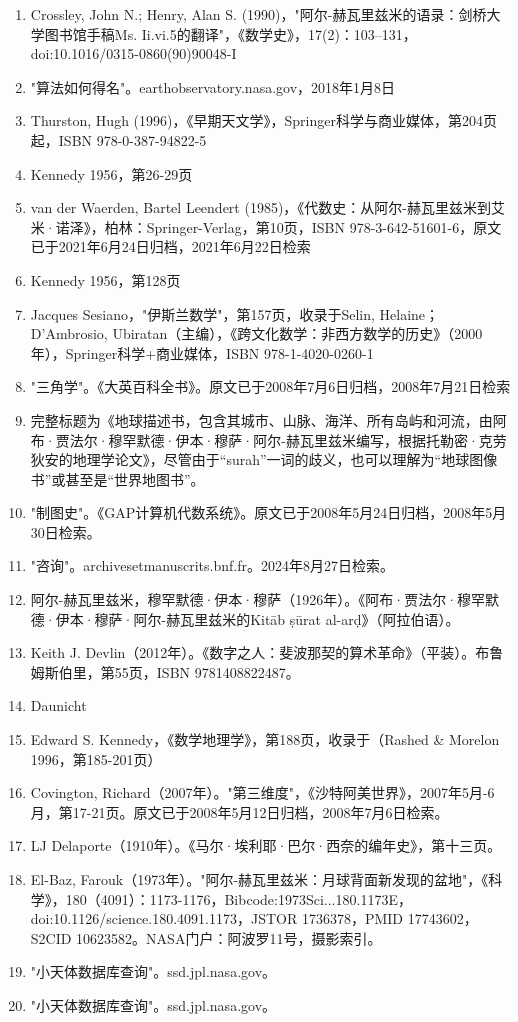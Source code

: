 \begin{enumerate}
\item Crossley, John N.; Henry, Alan S. (1990)，"阿尔-赫瓦里兹米的语录：剑桥大学图书馆手稿Ms. Ii.vi.5的翻译"，《数学史》，17(2)：103–131，doi:10.1016/0315-0860(90)90048-I  
\item "算法如何得名"。earthobservatory.nasa.gov，2018年1月8日  
\item Thurston, Hugh (1996)，《早期天文学》，Springer科学与商业媒体，第204页起，ISBN 978-0-387-94822-5  
\item Kennedy 1956，第26-29页  
\item van der Waerden, Bartel Leendert (1985)，《代数史：从阿尔-赫瓦里兹米到艾米·诺泽》，柏林：Springer-Verlag，第10页，ISBN 978-3-642-51601-6，原文已于2021年6月24日归档，2021年6月22日检索  
\item Kennedy 1956，第128页  
\item Jacques Sesiano，"伊斯兰数学"，第157页，收录于Selin, Helaine；D'Ambrosio, Ubiratan（主编），《跨文化数学：非西方数学的历史》（2000年），Springer科学+商业媒体，ISBN 978-1-4020-0260-1  
\item "三角学"。《大英百科全书》。原文已于2008年7月6日归档，2008年7月21日检索
\item 完整标题为《地球描述书，包含其城市、山脉、海洋、所有岛屿和河流，由阿布·贾法尔·穆罕默德·伊本·穆萨·阿尔-赫瓦里兹米编写，根据托勒密·克劳狄安的地理学论文》，尽管由于“surah”一词的歧义，也可以理解为“地球图像书”或甚至是“世界地图书”。
\item "制图史"。《GAP计算机代数系统》。原文已于2008年5月24日归档，2008年5月30日检索。
\item "咨询"。archivesetmanuscrits.bnf.fr。2024年8月27日检索。
\item 阿尔-赫瓦里兹米，穆罕默德·伊本·穆萨（1926年）。《阿布·贾法尔·穆罕默德·伊本·穆萨·阿尔-赫瓦里兹米的Kitāb ṣūrat al-arḍ》（阿拉伯语）。
\item Keith J. Devlin（2012年）。《数字之人：斐波那契的算术革命》（平装）。布鲁姆斯伯里，第55页，ISBN 9781408822487。
\item Daunicht
\item Edward S. Kennedy，《数学地理学》，第188页，收录于（Rashed & Morelon 1996，第185-201页）
\item Covington, Richard（2007年）。"第三维度"，《沙特阿美世界》，2007年5月-6月，第17-21页。原文已于2008年5月12日归档，2008年7月6日检索。
\item LJ Delaporte（1910年）。《马尔·埃利耶·巴尔·西奈的编年史》，第十三页。
\item El-Baz, Farouk（1973年）。"阿尔-赫瓦里兹米：月球背面新发现的盆地"，《科学》，180（4091）：1173-1176，Bibcode:1973Sci...180.1173E，doi:10.1126/science.180.4091.1173，JSTOR 1736378，PMID 17743602，S2CID 10623582。NASA门户：阿波罗11号，摄影索引。
\item "小天体数据库查询"。ssd.jpl.nasa.gov。
\item "小天体数据库查询"。ssd.jpl.nasa.gov。
\end{enumerate}
